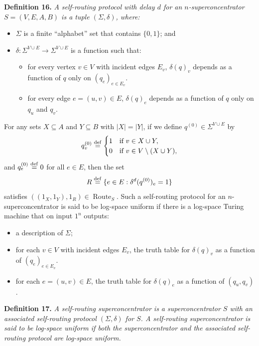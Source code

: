 \documentclass[10pt,a4paper]{article}
\newenvironment{originalresult}[1]{\par\medskip\noindent\textbf{#1.}\itshape}{\par\medskip}
\begin{document}
\begin{originalresult}{Definition 16}
A self-routing protocol with delay $d$ for an $n$-superconcentrator $S=(V,E,A,B)$ is a tuple $(\Sigma,\delta)$, where:
\begin{itemize}
\item $\Sigma$ is a finite ``alphabet'' set that contains $\{0,1\}$; and
\item $\delta:\Sigma^{V\cup E}\to\Sigma^{V\cup E}$ is a function such that:
\begin{itemize}
\item for every vertex $v\in V$ with incident edges $E_v$, $\delta(q)_v$ depends as a function of $q$ only on $(q_e)_{e\in E_v}$.
\item for every edge $e=(u,v)\in E$, $\delta(q)_e$ depends as a function of $q$ only on $q_u$ and $q_v$.
\end{itemize}
\end{itemize}
For any sets $X\subseteq A$ and $Y\subseteq B$ with $|X|=|Y|$, if we define $q^{(0)}\in\Sigma^{V\cup E}$ by
\[q_v^{(0)}\stackrel{\rm def}=\begin{cases}1&\text{if }v\in X\cup Y,\\0&\text{if }v\in V\setminus(X\cup Y),\end{cases}\]
and $q_e^{(0)}\stackrel{\rm def}=0$ for all $e\in E$, then the set
\[R\stackrel{\rm def}=\{e\in E:\delta^d(q^{(0)})_e=1\}\]
satisfies $((1_X,1_Y),1_R)\in\operatorname{Route}_S$.
Such a self-routing protocol for an $n$-superconcentrator is said to be log-space uniform if there is a log-space Turing machine that on input $1^n$ outputs:
\begin{itemize}
\item a description of $\Sigma$;
\item for each $v\in V$ with incident edges $E_v$, the truth table for $\delta(q)_v$ as a function of $(q_e)_{e\in E_v}$.
\item for each $e=(u,v)\in E$, the truth table for $\delta(q)_e$ as a function of $(q_u,q_v)$.
\end{itemize}
\end{originalresult}
\begin{originalresult}{Definition 17}
A self-routing superconcentrator is a superconcentrator $S$ with an associated self-routing protocol $(\Sigma,\delta)$ for $S$. A self-routing superconcentrator is said to be log-space uniform if both the superconcentrator and the associated self-routing protocol are log-space uniform.
\end{originalresult}
\end{document}
